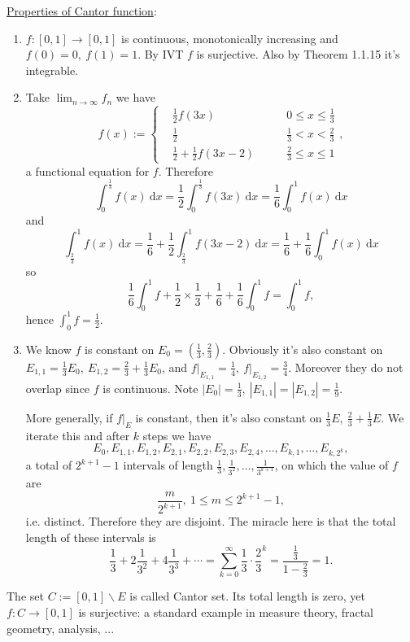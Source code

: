 \documentclass[a4paper]{article}
\theoremstyle{definition}
\begin{document}
\underline{Properties of Cantor function}:
\begin{enumerate}
    \item $f:[0,1]\rightarrow [0,1]$ is continuous, monotonically increasing and $f(0)=0,\ f(1)=1$. By IVT $f$ is surjective. Also by Theorem 1.1.15 it's integrable.
    \item Take $\lim_{n\rightarrow \infty} f_n$ we have
    \[
    f(x) := \left\{\begin{aligned}&\frac12 f (3x) \qquad &0\leq x \leq \frac13 \\ &\frac12 \qquad &\frac13 <x < \frac23 \\ &\frac12 + \frac12 f(3x-2) \qquad &\frac23 \leq x \leq 1\end{aligned} \right. ,
    \]
    a functional equation for $f$. Therefore
    \[
    \int_0^\frac13 f(x) \ \mathrm d x = \frac12 \int_0^\frac13 f(3x) \ \mathrm d x = \frac16 \int_0^1 f(x) \ \mathrm d x
    \]
    and
    \[
    \int_\frac23^1 f(x) \ \mathrm d x = \frac16 + \frac12 \int_\frac23^1 f(3x-2) \ \mathrm d x = \frac16 +\frac16 \int_0^1 f(x) \ \mathrm d x
    \]
    so
    \[
    \frac16 \int_0^1 f + \frac12 \times \frac13+\frac16+\frac16\int_0^1 f=\int_0^1 f,
    \]
    hence $\int_0^1 f = \frac12$.
    \item We know $f$ is constant on $E_0=\left(\frac13,\frac23 \right).$ Obviously it's also constant on $E_{1,1}=\frac13 E_0,\ E_{1,2}=\frac23+\frac13 E_0$, and $\left.f\right|_{E_{1,1}}=\frac14,\ \left.f\right|_{E_{1,2}}=\frac34$. Moreover they do not overlap since $f$ is continuous. Note $|E_0|=\frac13,\ |E_{1,1}|=|E_{1,2}|=\frac19$.
    
    More generally, if $\left.f\right|_E$ is constant, then it's also constant on $\frac13 E,\ \frac23+\frac13 E$. We iterate this and after $k$ steps we have 
    \[
    E_0,E_{1,1},E_{1,2},E_{2,1},E_{2,2},E_{2,3},E_{2,4},\ldots,E_{k,1},\ldots,E_{k,2^k},
    \]
    a total of $2^{k+1}-1$ intervals of length $\frac13,\frac{1}{3^2},\ldots,\frac{1}{3^{k+1}}$, on which the value of $f$ are
    \[
    \frac{m}{2^{k+1}},\ 1\leq m\leq 2^{k+1}-1,
    \]
    i.e. distinct. Therefore they are disjoint. The miracle here is that the total length of these intervals is
    \[
    \frac13+2\frac{1}{3^2}+4\frac{1}{3^3}+\cdots =\sum_{k=0}^\infty \frac13\cdot \frac{2}{3}^k =\frac{\frac13}{1-\frac23} =1.
    \]
\end{enumerate}
The set $C:=[0,1]\backslash E$ is called Cantor set. Its total length is zero, yet $f:C\rightarrow [0,1]$ is surjective: a standard example in measure theory, fractal geometry, analysis, ...
\end{document}
